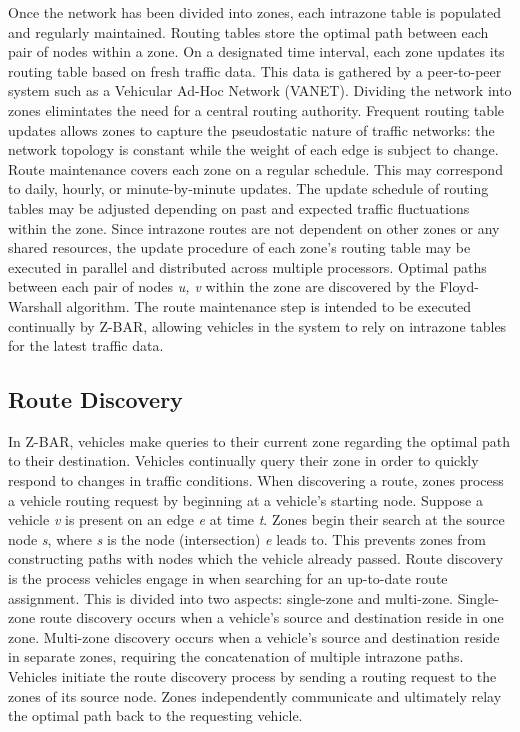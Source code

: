 \documentclass[conference]{IEEEtran}
\begin{document}
Once the network has been divided into zones, each intrazone table is populated and regularly maintained. Routing tables store the optimal path between each pair of nodes within a zone. On a designated time interval, each zone updates its routing table based on fresh traffic data. This data is gathered by a peer-to-peer system such as a Vehicular Ad-Hoc Network (VANET). Dividing the network into zones elimintates the need for a central routing authority. Frequent routing table updates allows zones to capture the pseudostatic nature of traffic networks: the network topology is constant while the weight of each edge is subject to change. Route maintenance covers each zone on a regular schedule. This may correspond to daily, hourly, or minute-by-minute updates. The update schedule of routing tables may be adjusted depending on past and expected traffic fluctuations within the zone. Since intrazone routes are not dependent on other zones or any shared resources, the update procedure of each zone's routing table may be executed in parallel and distributed across multiple processors. Optimal paths between each pair of nodes \textit{u, v} within the zone are discovered by the Floyd-Warshall algorithm. The route maintenance step is intended to be executed continually by Z-BAR, allowing vehicles in the system to rely on intrazone tables for the latest traffic data.

\subsection{Route Discovery}

In Z-BAR, vehicles make queries to their current zone regarding the optimal path to their destination. Vehicles continually query their zone in order to quickly respond to changes in traffic conditions. When discovering a route, zones process a vehicle routing request by beginning at a vehicle's starting node. Suppose a vehicle \textit{v} is present on an edge \textit{e} at time \textit{t}. Zones begin their search at the source node \textit{s}, where \textit{s} is the node (intersection) \textit{e} leads to. This prevents zones from constructing paths with nodes which the vehicle already passed. Route discovery is the process vehicles engage in when searching for an up-to-date route assignment. This is divided into two aspects: single-zone and multi-zone. Single-zone route discovery occurs when a vehicle's source and destination reside in one zone. Multi-zone discovery occurs when a vehicle's source and destination reside in separate zones, requiring the concatenation of multiple intrazone paths. Vehicles initiate the route discovery process by sending a routing request to the zones of its source node. Zones independently communicate and ultimately relay the optimal path back to the requesting vehicle.
\end{document}
